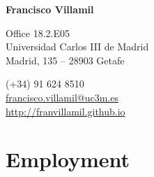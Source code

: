 \documentclass[a4paper, 12pt]{article}
\begin{document}

\begin{center}
{\bfseries\Large Francisco Villamil}
\end{center}

\vspace{0pt}

\noindent
\begin{minipage}[t]{0.47\textwidth}\small
\flushright
	Office 18.2.E05\\
	Universidad Carlos III de Madrid\\
	Madrid, 135 -- 28903 Getafe\\
\end{minipage}\hfill
\begin{minipage}[t]{0.47\textwidth}\small
   \hspace{5pt} (+34) 91 624 8510\\
	 \hspace{5pt} \href{mailto:francisco.villamil@uc3m.es}{francisco.villamil@uc3m.es}\\
	 \hspace{5pt} \href{http://franvillamil.github.io}{http://franvillamil.github.io}\\
\end{minipage}


\vspace{-10pt}
\section*{Employment}
\end{document}
